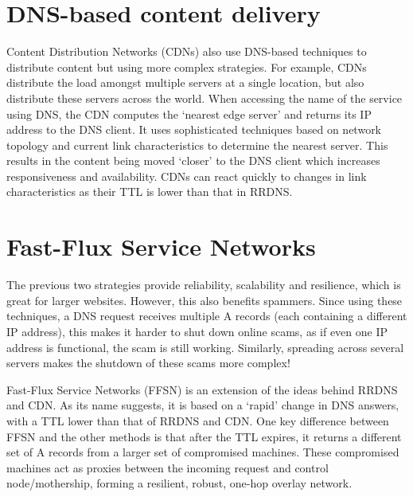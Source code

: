 \documentclass[11pt]{article}
\begin{document}
\section{DNS-based content delivery}
\label{sec:org48f1caf}

Content Distribution Networks (CDNs) also use DNS-based techniques to distribute content but using more complex strategies. For example, CDNs distribute the load amongst multiple servers at a single location, but also distribute these servers across the world. When accessing the name of the service using DNS, the CDN computes the ‘nearest edge server’ and returns its IP address to the DNS client. It uses sophisticated techniques based on network topology and current link characteristics to determine the nearest server. This results in the content being moved ‘closer’ to the DNS client which increases responsiveness and availability. CDNs can react quickly to changes in link characteristics as their TTL is lower than that in RRDNS. 

\section{Fast-Flux Service Networks}
\label{sec:orgf71fe4c}

The previous two strategies provide reliability, scalability and resilience, which is great for larger websites. However, this also benefits spammers. Since using these techniques, a DNS request receives multiple A records (each containing a different IP address), this makes it harder to shut down online scams, as if even one IP address is functional, the scam is still working. Similarly, spreading across several servers makes the shutdown of these scams more complex!

Fast-Flux Service Networks (FFSN) is an extension of the ideas behind RRDNS and CDN. As its name suggests, it is based on a ‘rapid’ change in DNS answers, with a TTL lower than that of RRDNS and CDN. One key difference between FFSN and the other methods is that after the TTL expires, it returns a different set of A records from a larger set of compromised machines. These compromised machines act as proxies between the incoming request and control node/mothership, forming a resilient, robust, one-hop overlay network.
\end{document}
